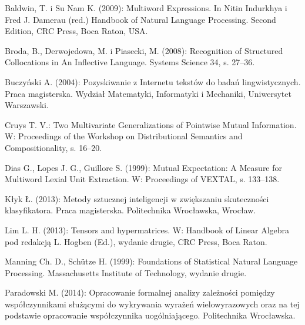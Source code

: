 \documentclass[11pt,a4paper]{llncs}
\begin{document}
\begin{thebibliography}{4}

 Baldwin, T. i Su Nam K. (2009): Multiword Expressions. In Nitin Indurkhya i Fred J. Damerau (red.) Handbook of Natural Language Processing. Second Edition, CRC Press, Boca Raton, USA.


 Broda, B., Derwojedowa, M. i Piasecki, M. (2008): Recognition of Structured Collocations in An Inflective Language. Systems Science 34, s. 27--36.

	Buczyński A. (2004): Pozyskiwanie z Internetu tekstów do badań lingwistycznych. Praca magisterska.
	Wydział Matematyki, Informatyki i Mechaniki, 	Uniwersytet Warszawski.

	Cruys T. V.: Two Multivariate Generalizations of Pointwise Mutual Information. W: Proceedings of the Workshop on Distributional Semantics and Compositionality, s. 16--20.

Dias G., Lopes J. G., Guillore S. (1999): Mutual Expectation: A Measure for Multiword Lexial Unit Extraction. W: Proceedings of VEXTAL, s. 133--138.
	



	Kłyk Ł. (2013): Metody sztucznej inteligencji w zwiększaniu skuteczności klasyfikatora. Praca magisterska.
	Politechnika Wrocławska, 	Wrocław.

	Lim L. H. (2013): Tensors and hypermatrices. W: Handbook of Linear Algebra pod redakcją L. Hogben (Ed.), 
	wydanie drugie, 
	CRC Press, Boca Raton.
		
 Manning Ch. D., Schütze H. (1999): Foundations of Statistical Natural Language Processing.
	Massachusetts Institute of Technology, 
	wydanie drugie.

	Paradowski M. (2014): Opracowanie formalnej analizy zależności pomiędzy współczynnikami służącymi do wykrywania wyrażeń wielowyrazowych oraz na tej podstawie opracowanie współczynnika uogólniającego. Politechnika Wrocławska.


\end{thebibliography}
\end{document}
